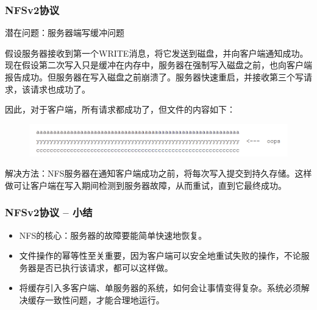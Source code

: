 \begin{frame}[fragile]
    \frametitle{NFSv2协议}
    潜在问题：服务器端写缓冲问题
    
    假设服务器接收到第一个WRITE消息，将它发送到磁盘，并向客户端通知成功。现在假设第二次写入只是缓冲在内存中，服务器在强制写入磁盘之前，也向客户端报告成功。但服务器在写入磁盘之前崩溃了。服务器快速重启，并接收第三个写请求，该请求也成功了。
    
    因此，对于客户端，所有请求都成功了，但文件的内容如下：
    
    \begin{figure}
        \includegraphics[width=0.9\linewidth]{figs/nfsv2-srv2.png}
    \end{figure}
    
    解决方法：NFS服务器在通知客户端成功之前，将每次写入提交到持久存储。这样做可让客户端在写入期间检测到服务器故障，从而重试，直到它最终成功。
\end{frame}

\begin{frame}[fragile]
    \frametitle{NFSv2协议 -- 小结}
    
        \begin{itemize}
            \item NFS的核心：服务器的故障要能简单快速地恢复。
            \item 文件操作的幂等性至关重要，因为客户端可以安全地重试失败的操作，不论服务器是否已执行该请求，都可以这样做。
            \item 将缓存引入多客户端、单服务器的系统，如何会让事情变得复杂。系统必须解决缓存一致性问题，才能合理地运行。
            
            
        \end{itemize}
    
%    
\end{frame}

